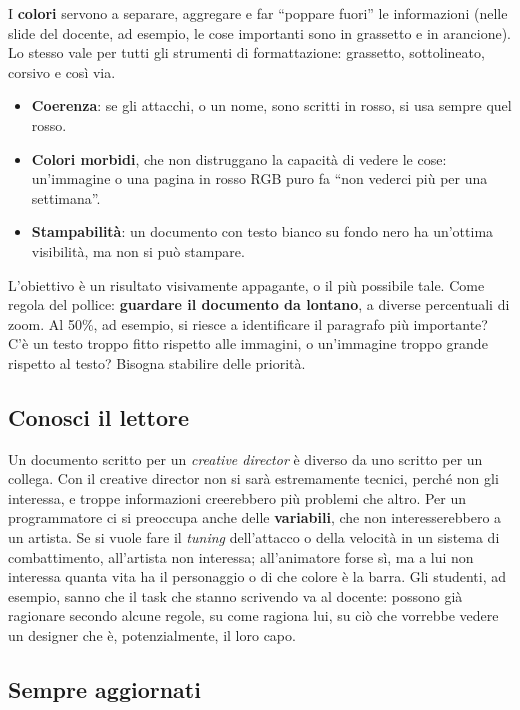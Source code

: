 I \textbf{colori} servono a separare, aggregare e far ``poppare fuori'' le
informazioni (nelle slide del docente, ad esempio, le cose importanti sono in
grassetto e in arancione). Lo stesso vale per tutti gli strumenti di
formattazione: grassetto, sottolineato, corsivo e così via.
\begin{itemize}
  \item \textbf{Coerenza}: se gli attacchi, o un nome, sono scritti in rosso,
        si usa sempre quel rosso.
  \item \textbf{Colori morbidi}, che non distruggano la capacità di vedere le
        cose: un'immagine o una pagina in rosso RGB puro fa ``non vederci più
        per una settimana''.
  \item \textbf{Stampabilità}: un documento con testo bianco su fondo nero ha
        un'ottima visibilità, ma non si può stampare.
\end{itemize}
L'obiettivo è un risultato visivamente appagante, o il più possibile tale.
Come regola del pollice: \textbf{guardare il documento da lontano}, a diverse
percentuali di zoom. Al 50\%, ad esempio, si riesce a identificare il
paragrafo più importante? C'è un testo troppo fitto rispetto alle immagini, o
un'immagine troppo grande rispetto al testo? Bisogna stabilire delle
priorità.

\subsection{Conosci il lettore}

Un documento scritto per un \emph{creative director} è diverso da uno scritto
per un collega. Con il creative director non si sarà estremamente tecnici,
perché non gli interessa, e troppe informazioni creerebbero più problemi che
altro. Per un programmatore ci si preoccupa anche delle \textbf{variabili},
che non interesserebbero a un artista. Se si vuole fare il \emph{tuning}
dell'attacco o della velocità in un sistema di combattimento, all'artista non
interessa; all'animatore forse sì, ma a lui non interessa quanta vita ha il
personaggio o di che colore è la barra. Gli studenti, ad esempio, sanno che il
task che stanno scrivendo va al docente: possono già ragionare secondo alcune
regole, su come ragiona lui, su ciò che vorrebbe vedere un designer che è,
potenzialmente, il loro capo.

\subsection{Sempre aggiornati}

